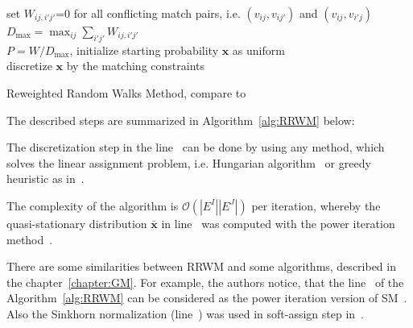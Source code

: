 \begin{algorithm}[h] 
	set $W_{ij,i'j'}$=0 for all conflicting match pairs, i.e. $(v_{ij},v_{ij'})$ and $(v_{ij},v_{i'j})$ \\
	$D_{\text{max}}=\max_{ij}\sum_{i'j'}W_{ij,i'j'}$ \\
	$P=W/D_{\text{max}}$, initialize starting probability $\mathbf{x}$ as uniform\\
	discretize $\mathbf{x}$ by the matching constraints %
	\caption{Reweighted Random Walks Method, compare to~\cite{Cho2010_RRWM}}    
	\label{alg:RRWM}
\end{algorithm}

The described steps are summarized in Algorithm~\ref{alg:RRWM} below:

The discretization step in the line~ can be done by using any method, which solves the linear assignment problem, i.e. Hungarian algorithm~\cite{Kuhn1955} or greedy heuristic as in~\cite{Leordeanu2005_SM}.

The complexity of the algorithm is $\mathcal{O}(|E^I||E^J|)$ per iteration, whereby the quasi-stationary distribution $\mathbf{\bar{x}}$ in line~ was computed with the power iteration method~\cite{PowerIteration}.

There are some similarities between RRWM and some algorithms, described in the chapter~\ref{chapter:GM}. For example, the authors notice, that the line~ of the Algorithm~\ref{alg:RRWM} can be considered as the power iteration version of SM~\cite{Leordeanu2005_SM}. Also the Sinkhorn normalization (line~) was used in soft-assign step in~\cite{Rangarajan1996_GAGM}. 

